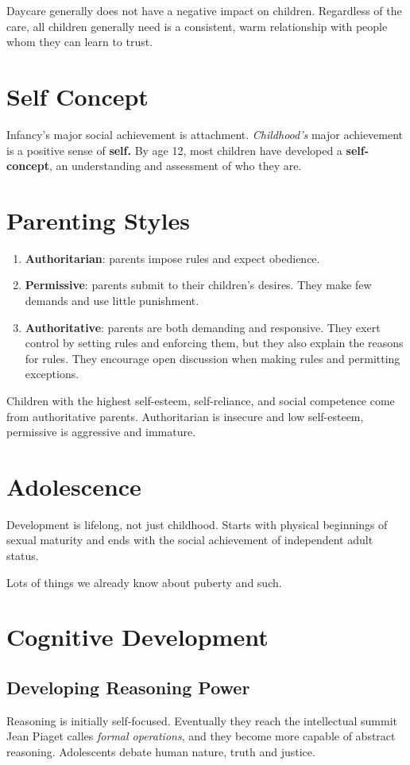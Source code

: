 \documentclass[12pt]{article}
\begin{document}
Daycare generally does not have a negative impact on children. Regardless of the care, all children generally need is a consistent, warm relationship with people whom they can learn to trust.

\section*{Self Concept}
Infancy's major social achievement is attachment. \textit{Childhood's} major achievement is a positive sense of \textbf{self.} By age 12, most children have developed a \textbf{self-concept}, an understanding and assessment of who they are.

\section*{Parenting Styles}
\begin{enumerate}
  \item {\bf Authoritarian}: parents impose rules and expect obedience. 
  \item {\bf Permissive}: parents submit to their children's desires. They make few demands and use little punishment.
  \item {\bf Authoritative}: parents are both demanding and responsive. They exert control by setting rules and enforcing them, but they also explain the reasons for rules. They encourage open discussion when making rules and permitting exceptions.  
\end{enumerate} 
Children with the highest self-esteem, self-reliance, and social competence come from authoritative parents. Authoritarian is insecure and low self-esteem, permissive is aggressive and immature.

\section*{Adolescence}
Development is lifelong, not just childhood. Starts with physical beginnings of sexual maturity and ends with the social achievement of independent adult status. 

Lots of things we already know about puberty and such. 

\section*{Cognitive Development}
\subsection*{Developing Reasoning Power}
Reasoning is initially self-focused. Eventually they reach the intellectual summit Jean Piaget calles \textit{formal operations}, and they become more capable of abstract reasoning. Adolescents debate human nature, truth and justice.
\end{document}
